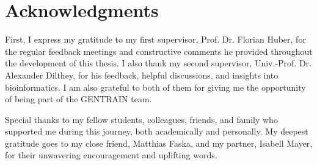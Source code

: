 \section*{Acknowledgments}
\noindent First, I express my gratitude to my first supervisor, Prof. Dr. Florian Huber, for the regular feedback meetings and constructive comments he provided throughout the development of this thesis. I also thank my second supervisor, Univ.-Prof. Dr. Alexander Dilthey, for his feedback, helpful discussions, and insights into bioinformatics. I am also grateful to both of them for giving me the opportunity of being part of the GENTRAIN team.
\par\vspace{1em} 
\noindent Special thanks to my fellow students, colleagues, friends, and family who supported me during this journey, both academically and personally. My deepest gratitude goes to my close friend, Matthias Faska, and my partner, Isabell Mayer, for their unwavering encouragement and uplifting words.
